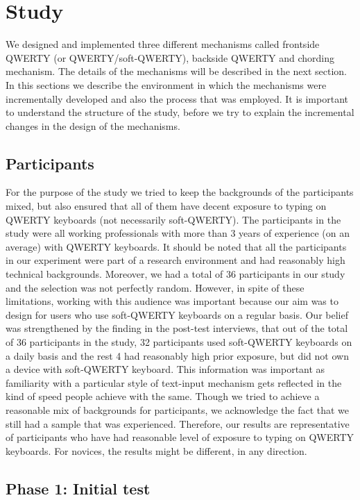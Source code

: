 \section{Study}

We designed and implemented three different mechanisms called frontside QWERTY (or QWERTY/soft-QWERTY), backside QWERTY and chording mechanism. The details of the mechanisms will be described in the next section. In this sections we describe the environment in which the mechanisms were incrementally developed and also the process that was employed. It is important to understand the structure of the study, before we try to explain the incremental changes in the design of the mechanisms.

\subsection{Participants}

For the purpose of the study we tried to keep the backgrounds of the participants mixed, but also ensured that all of them have decent exposure to typing on QWERTY keyboards (not necessarily soft-QWERTY). The participants in the study were all working professionals with more than 3 years of experience (on an average)
with QWERTY keyboards. It should be noted that all the participants in our experiment were part of a research environment and had reasonably high technical backgrounds. Moreover, we had a total of 36 participants in our study and the selection was not perfectly random. However, in spite of these limitations, working with this audience was important because our aim was to design for users who use soft-QWERTY keyboards on a regular basis. Our belief was strengthened by the finding in the post-test interviews, that out of the total of 36 participants in the study, 32 participants used soft-QWERTY keyboards on a daily basis and the rest 4 had reasonably high prior exposure, but did not own a device with soft-QWERTY keyboard. This information was important as familiarity with a particular style of text-input mechanism gets reflected in the kind of speed people achieve with the same. Though we tried to achieve a reasonable mix of backgrounds for participants, we acknowledge the fact that we still had a sample that was experienced. Therefore, our results are representative of participants who have had reasonable level of exposure to typing on QWERTY keyboards. For novices, the results might be different, in any direction.

\subsection{Phase 1: Initial test}


